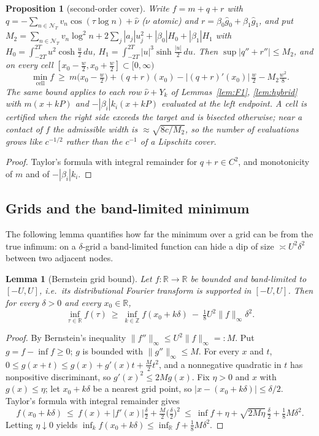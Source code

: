 \documentclass[11pt]{amsart}
\newtheorem{proposition}[theorem]{Proposition}
\newtheorem{lemma}[theorem]{Lemma}
\theoremstyle{definition}
\theoremstyle{remark}
\newcommand{\R}{\mathbb R}
\newcommand{\Z}{\mathbb Z}
\newcommand{\gh}[1]{\widehat g_{#1}}
\newcommand{\nuh}{\widehat\nu}
\newcommand{\NT}{\mathcal N_T}
\begin{document}
\begin{proposition}[second-order cover]\label{prop:TAY}
Write $f=m+q+r$ with $q=-\sum_{n\in\NT}v_n\cos(\tau\log n)+\nuh$ ($\nu$ atomic) and
$r=\beta_0\gh0+\beta_1\gh1$, and put
$M_2=\sum_{n\in\NT}v_n\log^2n+2\sum_j|a_j|u_j^2+|\beta_0|H_0+|\beta_1|H_1$ with
$H_0=\int_{-2T}^{2T}u^2\cosh\frac u2\,du$, $H_1=\int_{-2T}^{2T}|u|^3\sinh\frac{|u|}2\,du$. Then
$\sup|q''+r''|\le M_2$, and on every cell $[x_0-\frac w2,x_0+\frac w2]\subset[0,\infty)$
\[
\min_{\text{cell}}f\ \ge\ m\!\big(x_0-\tfrac w2\big)+(q+r)(x_0)-|(q+r)'(x_0)|\,\tfrac w2-M_2\tfrac{w^2}8 .
\]
The same bound applies to each row $\nuh+Y_k$ of Lemmas~\ref{lem:F1}, \ref{lem:hybrid} with
$m(x+kP)$ and $-|\beta_i|k_i(x+kP)$ evaluated at the left endpoint. A cell is certified when the
right side exceeds the target and is bisected otherwise; near a contact of $f$ the admissible width
is $\approx\sqrt{8c/M_2}$, so the number of evaluations grows like $c^{-1/2}$ rather than the
$c^{-1}$ of a Lipschitz cover.
\end{proposition}
\begin{proof}
Taylor's formula with integral remainder for $q+r\in C^2$, and monotonicity of $m$ and of
$-|\beta_i|k_i$.
\end{proof}



\subsection{Grids and the band-limited minimum}
The following lemma quantifies how far the minimum over a grid can be from the true infimum: on a
$\delta$-grid a band-limited function can hide a dip of size $\asymp U^2\delta^2$ between two adjacent
nodes.

\begin{lemma}[Bernstein grid bound]\label{lem:bern}
Let $f:\R\to\R$ be bounded and band-limited to $[-U,U]$, i.e.\ its distributional Fourier transform
is supported in $[-U,U]$. Then for every $\delta>0$ and every $x_0\in\R$,
\[
\inf_{\tau\in\R}f(\tau)\ \ge\ \inf_{k\in\Z}f(x_0+k\delta)\ -\ \tfrac18U^2\|f\|_\infty\delta^2 .
\]
\end{lemma}
\begin{proof}
By Bernstein's inequality $\|f''\|_\infty\le U^2\|f\|_\infty=:M$. Put $g=f-\inf f\ge0$; $g$ is
bounded with $\|g''\|_\infty\le M$. For every $x$ and $t$, $0\le g(x+t)\le g(x)+g'(x)t+\frac M2t^2$,
and a nonnegative quadratic in $t$ has nonpositive discriminant, so $g'(x)^2\le2Mg(x)$. Fix
$\eta>0$ and $x$ with $g(x)\le\eta$; let $x_0+k\delta$ be a nearest grid point, so
$|x-(x_0+k\delta)|\le\delta/2$. Taylor's formula with integral remainder gives
\[
f(x_0+k\delta)\ \le\ f(x)+|f'(x)|\tfrac\delta2+\tfrac M2\Big(\tfrac\delta2\Big)^2
\ \le\ \inf f+\eta+\sqrt{2M\eta}\,\tfrac\delta2+\tfrac18M\delta^2 .
\]
Letting $\eta\downarrow0$ yields $\inf_kf(x_0+k\delta)\le\inf_\R f+\frac18M\delta^2$.
\end{proof}
\end{document}
